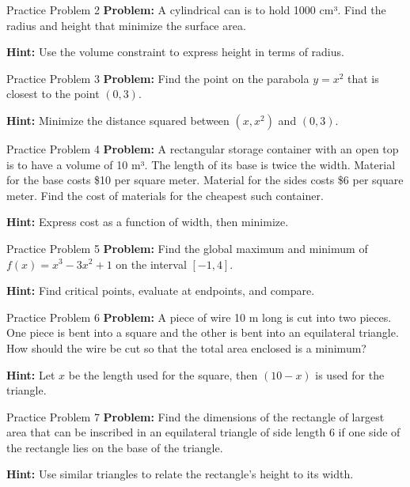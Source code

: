 \documentclass[aspectratio=169]{beamer}
\begin{document}
\begin{frame}{Practice Problem 2}
\textbf{Problem:} A cylindrical can is to hold 1000 cm³. Find the radius and height that minimize the surface area.

\textbf{Hint:} Use the volume constraint to express height in terms of radius.
\end{frame}

\begin{frame}{Practice Problem 3}
\textbf{Problem:} Find the point on the parabola $y = x^2$ that is closest to the point $(0,3)$.

\textbf{Hint:} Minimize the distance squared between $(x,x^2)$ and $(0,3)$.
\end{frame}

\begin{frame}{Practice Problem 4}
\textbf{Problem:} A rectangular storage container with an open top is to have a volume of 10 m³. The length of its base is twice the width. Material for the base costs \$10 per square meter. Material for the sides costs \$6 per square meter. Find the cost of materials for the cheapest such container.

\textbf{Hint:} Express cost as a function of width, then minimize.
\end{frame}

\begin{frame}{Practice Problem 5}
\textbf{Problem:} Find the global maximum and minimum of $f(x) = x^3 - 3x^2 + 1$ on the interval $[-1,4]$.

\textbf{Hint:} Find critical points, evaluate at endpoints, and compare.
\end{frame}

\begin{frame}{Practice Problem 6}
\textbf{Problem:} A piece of wire 10 m long is cut into two pieces. One piece is bent into a square and the other is bent into an equilateral triangle. How should the wire be cut so that the total area enclosed is a minimum?

\textbf{Hint:} Let $x$ be the length used for the square, then $(10-x)$ is used for the triangle.
\end{frame}

\begin{frame}{Practice Problem 7}
\textbf{Problem:} Find the dimensions of the rectangle of largest area that can be inscribed in an equilateral triangle of side length 6 if one side of the rectangle lies on the base of the triangle.

\textbf{Hint:} Use similar triangles to relate the rectangle's height to its width.
\end{frame}
\end{document}
